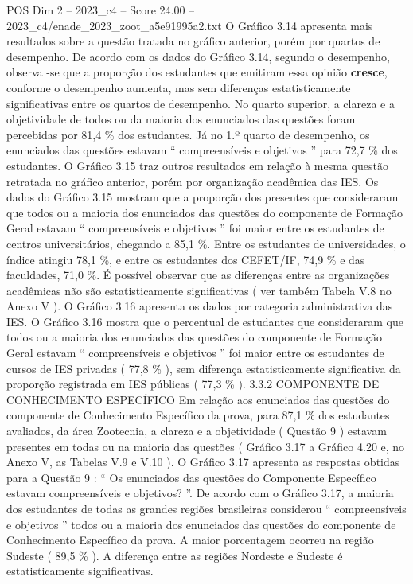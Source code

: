 \begin{textsample}{POS Dim 2 – 2023\_c4 – Score 24.00 – 2023\_c4/enade\_2023\_zoot\_a5e91995a2.txt}
O Gráfico 3.14 apresenta mais resultados sobre a questão tratada no gráfico anterior, porém por quartos de desempenho.
De acordo com os dados do Gráfico 3.14, segundo o desempenho, observa -se que a proporção dos estudantes que emitiram essa opinião \textbf{cresce}, conforme o desempenho aumenta, mas sem diferenças estatisticamente significativas entre os quartos de desempenho.
No quarto superior, a clareza e a objetividade de todos ou da maioria dos enunciados das questões foram percebidas por 81,4 \% dos estudantes.
Já no 1.º quarto de desempenho, os enunciados das questões estavam “ compreensíveis e objetivos ” para 72,7 \% dos estudantes.
O Gráfico 3.15 traz outros resultados em relação à mesma questão retratada no gráfico anterior, porém por organização acadêmica das IES.
Os dados do Gráfico 3.15 mostram que a proporção dos presentes que consideraram que todos ou a maioria dos enunciados das questões do componente de Formação Geral estavam “ compreensíveis e objetivos ” foi maior entre os estudantes de centros universitários, chegando a 85,1 \%.
Entre os estudantes de universidades, o índice atingiu 78,1 \%, e entre os estudantes dos CEFET/IF, 74,9 \% e das faculdades, 71,0 \%.
É possível observar que as diferenças entre as organizações acadêmicas não são estatisticamente significativas ( ver também Tabela V.8 no Anexo V ).
O Gráfico 3.16 apresenta os dados por categoria administrativa das IES.
O Gráfico 3.16 mostra que o percentual de estudantes que consideraram que todos ou a maioria dos enunciados das questões do componente de Formação Geral estavam “ compreensíveis e objetivos ” foi maior entre os estudantes de cursos de IES privadas ( 77,8 \% ), sem diferença estatisticamente significativa da proporção registrada em IES públicas ( 77,3 \% ). 3.3.2 COMPONENTE DE CONHECIMENTO ESPECÍFICO Em relação aos enunciados das questões do componente de Conhecimento Específico da prova, para 87,1 \% dos estudantes avaliados, da área Zootecnia, a clareza e a objetividade ( Questão 9 ) estavam presentes em todas ou na maioria das questões ( Gráfico 3.17 a Gráfico 4.20 e, no Anexo V, as Tabelas V.9 e V.10 ).
O Gráfico 3.17 apresenta as respostas obtidas para a Questão 9 : “ Os enunciados das questões do Componente Específico estavam compreensíveis e objetivos? ”.
De acordo com o Gráfico 3.17, a maioria dos estudantes de todas as grandes regiões brasileiras considerou “ compreensíveis e objetivos ” todos ou a maioria dos enunciados das questões do componente de Conhecimento Específico da prova.
A maior porcentagem ocorreu na região Sudeste ( 89,5 \% ).
A diferença entre as regiões Nordeste e Sudeste é estatisticamente significativas.

\end{textsample}
